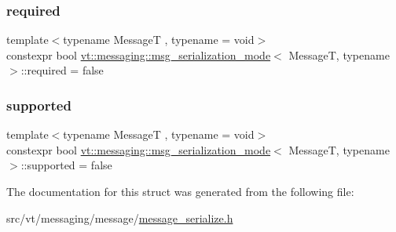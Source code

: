 \mbox{\label{structvt_1_1messaging_1_1msg__serialization__mode_a8f8d90f9eb1935c504685abe11600a57}} 
\subsubsection{\texorpdfstring{required}{required}}
{\footnotesize\ttfamily template$<$typename MessageT , typename  = void$>$ \\
constexpr bool \hyperlink{structvt_1_1messaging_1_1msg__serialization__mode}{vt\+::messaging\+::msg\+\_\+serialization\+\_\+mode}$<$ MessageT, typename $>$\+::required = false\hspace{0.3cm}{\ttfamily [static]}}

\mbox{\label{structvt_1_1messaging_1_1msg__serialization__mode_ab0dc8ca8b40b6e796c4d6b3ee63a69e1}} 
\subsubsection{\texorpdfstring{supported}{supported}}
{\footnotesize\ttfamily template$<$typename MessageT , typename  = void$>$ \\
constexpr bool \hyperlink{structvt_1_1messaging_1_1msg__serialization__mode}{vt\+::messaging\+::msg\+\_\+serialization\+\_\+mode}$<$ MessageT, typename $>$\+::supported = false\hspace{0.3cm}{\ttfamily [static]}}



The documentation for this struct was generated from the following file\+:\begin{DoxyCompactItemize}
\item 
src/vt/messaging/message/\hyperlink{message__serialize_8h}{message\+\_\+serialize.\+h}\end{DoxyCompactItemize}
